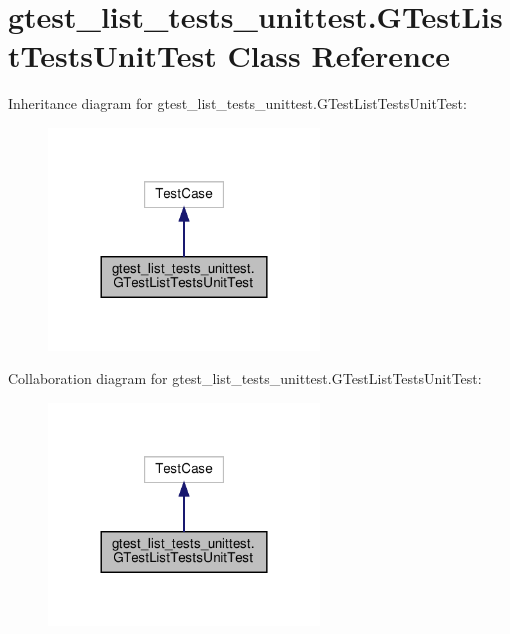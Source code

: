 \hypertarget{classgtest__list__tests__unittest_1_1_g_test_list_tests_unit_test}{}\section{gtest\+\_\+list\+\_\+tests\+\_\+unittest.\+G\+Test\+List\+Tests\+Unit\+Test Class Reference}
\label{classgtest__list__tests__unittest_1_1_g_test_list_tests_unit_test}


Inheritance diagram for gtest\+\_\+list\+\_\+tests\+\_\+unittest.\+G\+Test\+List\+Tests\+Unit\+Test\+:
\nopagebreak
\begin{figure}[H]
\begin{center}
\leavevmode
\includegraphics[width=204pt]{classgtest__list__tests__unittest_1_1_g_test_list_tests_unit_test__inherit__graph}
\end{center}
\end{figure}


Collaboration diagram for gtest\+\_\+list\+\_\+tests\+\_\+unittest.\+G\+Test\+List\+Tests\+Unit\+Test\+:
\nopagebreak
\begin{figure}[H]
\begin{center}
\leavevmode
\includegraphics[width=204pt]{classgtest__list__tests__unittest_1_1_g_test_list_tests_unit_test__coll__graph}
\end{center}
\end{figure}
